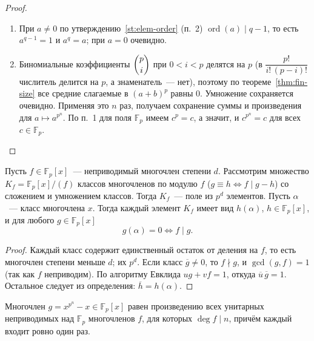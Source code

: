 \documentclass[12pt]{article}
\begin{document}
	\begin{proof}
		\begin{enumerate}
			\item При $a \ne 0$ по утверждению~\ref{st:elem-order} (п.~2) $\operatorname{ord}(a) \mid q - 1$, то есть $a^{q-1} = 1$ и $a^q = a$; при $a = 0$ очевидно.
			\item Биномиальные коэффициенты $\dbinom{p}{i}$ при $0 < i < p$ делятся на $p$ (в $\dfrac{p!}{i!\,(p-i)!}$ числитель делится на $p$, а знаменатель~--- нет), поэтому по теореме~\ref{thm:fin-size} все средние слагаемые в $(a+b)^p$ равны $0$. Умножение сохраняется очевидно. Применяя это $n$ раз, получаем сохранение суммы и произведения для $a \mapsto a^{p^n}$. По п.~1 для поля $\mathbb{F}_p$ имеем $c^p = c$, а значит, и $c^{p^n} = c$ для всех $c \in \mathbb{F}_p$.
		\end{enumerate}
	\end{proof}

	\begin{statement}\label{st:quotient-field}
		Пусть $f \in \mathbb{F}_p[x]$~--- неприводимый многочлен степени $d$. Рассмотрим множество $K_f = \mathbb{F}_p[x]/(f)$ классов многочленов по модулю $f$ ($g \equiv h \iff f \mid g - h$) со сложением и умножением классов. Тогда $K_f$~--- поле из $p^d$ элементов. Пусть $\alpha$~--- класс многочлена $x$. Тогда каждый элемент $K_f$ имеет вид $h(\alpha)$, $h \in \mathbb{F}_p[x]$, и для любого $g \in \mathbb{F}_p[x]$
		\[
			g(\alpha) = 0 \iff f \mid g.
		\]
	\end{statement}

	\begin{proof}
		Каждый класс содержит единственный остаток от деления на $f$, то есть многочлен степени меньше $d$; их $p^d$. Если класс $\overline{g} \ne 0$, то $f \nmid g$, и $\gcd(g, f) = 1$ (так как $f$ неприводим). По алгоритму Евклида $ug + vf = 1$, откуда $\overline{u}\,\overline{g} = 1$. Остальное следует из определения: $\overline{h} = h(\alpha)$.
	\end{proof}

	\begin{theorem}[о разложении $x^{p^n} - x$]\label{thm:fin-xpn}
		Многочлен $g = x^{p^n} - x \in \mathbb{F}_p[x]$ равен произведению всех унитарных неприводимых над $\mathbb{F}_p$ многочленов $f$, для которых $\deg f \mid n$, причём каждый входит ровно один раз.
	\end{theorem}
\end{document}
